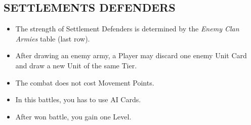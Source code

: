 \begin{multicols}{2}
\subsection*{\MakeUppercase{Settlements defenders}}
\begin{itemize}
  \item The strength of Settlement Defenders is determined by the \textit{Enemy Clan Armies} table (last row).
  \item After drawing an enemy army, a Player may discard one enemy Unit Card and draw a new Unit of the same Tier.
  \item The combat does not cost Movement Points.
  \item In this battles, you has to use AI Cards.
  \item After won battle, you gain one Level.
\end{itemize}

\columnbreak

\vspace*{\fill}

\end{multicols}

\vspace{2em}

